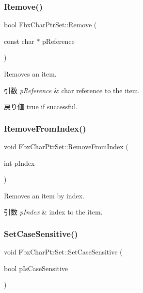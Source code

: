 \subsubsection{\texorpdfstring{Remove()}{Remove()}}
{\footnotesize\ttfamily bool Fbx\+Char\+Ptr\+Set\+::\+Remove (\begin{DoxyParamCaption}\item[{const char $\ast$}]{p\+Reference }\end{DoxyParamCaption})}

Removes an item. 
\begin{DoxyParams}{引数}
{\em p\+Reference} & char reference to the item. \\
\hline
\end{DoxyParams}
\begin{DoxyReturn}{戻り値}
true if successful. 
\end{DoxyReturn}
\mbox{\label{class_fbx_char_ptr_set_a2cfe1b7b1f73100b37decf29b3dba45e}} 
\subsubsection{\texorpdfstring{Remove\+From\+Index()}{RemoveFromIndex()}}
{\footnotesize\ttfamily void Fbx\+Char\+Ptr\+Set\+::\+Remove\+From\+Index (\begin{DoxyParamCaption}\item[{int}]{p\+Index }\end{DoxyParamCaption})}

Removes an item by index. 
\begin{DoxyParams}{引数}
{\em p\+Index} & index to the item. \\
\hline
\end{DoxyParams}
\mbox{\label{class_fbx_char_ptr_set_ad7da280af4a52c6b7aa3037fd7636f6f}} 
\subsubsection{\texorpdfstring{Set\+Case\+Sensitive()}{SetCaseSensitive()}}
{\footnotesize\ttfamily void Fbx\+Char\+Ptr\+Set\+::\+Set\+Case\+Sensitive (\begin{DoxyParamCaption}\item[{bool}]{p\+Is\+Case\+Sensitive }\end{DoxyParamCaption})\hspace{0.3cm}{\ttfamily [inline]}}




